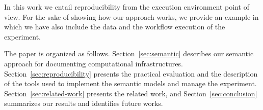 In this work we entail reproducibility from the execution environment point of view. For  the sake of showing how our approach works, we provide an example in which we have also include the data and the workflow execution of the experiment.

The paper is organized as follows. Section~\ref{sec:semantic} describes our semantic approach for documenting computational infrastructures. Section~\ref{sec:reproducibility} presents the practical evaluation and the description of the tools used to implement the semantic models and manage the experiment. Section~\ref{sec:related-work} presents the related work, and Section~\ref{sec:conclusion} summarizes our results and identifies future works.
